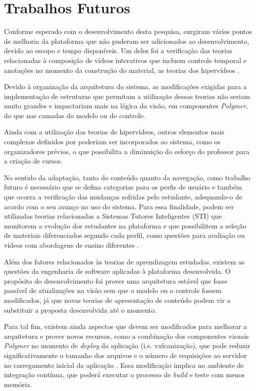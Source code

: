 \section*{Trabalhos Futuros}

Conforme esperado com o desenvolvimento desta pesquisa, surgiram vários pontos de melhoria da plataforma que não puderam ser adicionados ao desenvolvimento, devido ao escopo e tempo disponíveis. Um deles foi a verificação das teorias relacionadas à composição de vídeos interativos que incluem controle temporal e anotações no momento da construção do material, as teorias dos hipervídeos \cite{Sadallah2012}.

Devido à organização da arquitetura do sistema, as modificações exigidas para a implementação de estruturas que permitam a utilização dessas teorias não seriam muito grandes e impactariam mais na lógica da visão, em componentes \textit{Polymer}, do que nas camadas do modelo ou do controle.

Ainda com a utilização das teorias de hipervídeos, outros elementos mais complexos definidos por  poderiam ser incorporados ao sistema, como os organizadores prévios, o que possibilita a diminuição do esforço do professor para a criação de cursos.

No sentido da adaptação, tanto do conteúdo quanto da navegação, como trabalho futuro é necessário que se defina categorias para os perfis de usuário e também que ocorra a verificação das mudanças sofridas pelo estudante, adequando-o de acordo com o seu avanço no uso do sistema. Para essa finalidade, podem ser utilizadas teorias relacionadas a Sistemas Tutores Inteligentes (STI) que monitorem a evolução dos estudantes na plataforma e que possibilitem a seleção de materiais diferenciados segundo cada perfil, como questões para avaliação ou vídeos com abordagens de ensino diferentes \cite{fragelli2010}.

Além dos fatores relacionados às teorias de aprendizagem estudadas, existem as questões da engenharia de software aplicadas à plataforma desenvolvida. O propósito do desenvolvimento foi prover uma arquitetura estável que fosse passível de atualizações na visão sem que o modelo ou o controle fossem modificados, já que novas teorias de apresentação de conteúdo podem vir a substituir a proposta desenvolvida até o momento.

Para tal fim, existem ainda aspectos que devem ser modificados para melhorar a arquitetura e prover novos recursos, como a combinação dos componentes visuais \textit{Polymer} no momento de \textit{deploy} da aplicação (i.e. vulcanização), que pode reduzir significativamente o tamanho dos arquivos e o número de requisições ao servidor no carregamento inicial da aplicação \cite{vulcanize2013}. Essa modificação implica no ambiente de integração contínua, que poderá executar o processo de \textit{build} e teste com menos memória.

